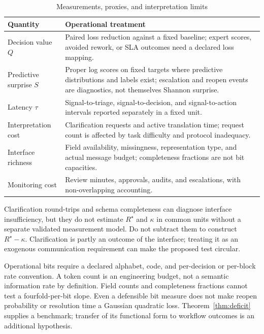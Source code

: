 \documentclass[11pt]{article}
\begin{document}
\begin{table}[htbp]
\centering
\caption{Measurements, proxies, and interpretation limits}
\label{tab:proxies}
\begin{tabularx}{\textwidth}{@{}l>{\raggedright\arraybackslash}X@{}}
\toprule
Quantity & Operational treatment \\
\midrule
Decision value $Q$ & Paired loss reduction against a fixed baseline; expert
scores, avoided rework, or SLA outcomes need a declared loss mapping. \\
Predictive surprise $S$ & Proper log scores on fixed targets where predictive
distributions and labels exist; escalation and reopen events are diagnostics,
not themselves Shannon surprise. \\
Latency $\tau$ & Signal-to-triage, signal-to-decision, and signal-to-action
intervals reported separately in a fixed unit. \\
Interpretation cost & Clarification requests and active translation time;
request count is affected by task difficulty and protocol inadequacy. \\
Interface richness & Field availability, missingness, representation type,
and actual message budget; completeness fractions are not bit capacities. \\
Monitoring cost & Review minutes, approvals, audits, and escalations, with
non-overlapping accounting. \\
\bottomrule
\end{tabularx}
\end{table}

Clarification round-trips and schema completeness can diagnose interface
insufficiency, but they do not estimate $R^\star$ and $\kappa$ in common
units without a separate validated measurement model. Do not subtract them to
construct $R^\star-\kappa$. Clarification is partly an outcome of the
interface; treating it as an exogenous communication requirement can make the
proposed test circular.

Operational bits require a declared alphabet, code, and per-decision or
per-block rate convention. A token count is an engineering budget, not a
semantic information rate by definition. Field counts and completeness
fractions cannot test a fourfold-per-bit slope. Even a defensible bit measure
does not make reopen probability or resolution time a Gaussian quadratic
loss. Theorem~\ref{thm:deficit} supplies a benchmark; transfer of its functional
form to workflow outcomes is an additional hypothesis.
\end{document}
